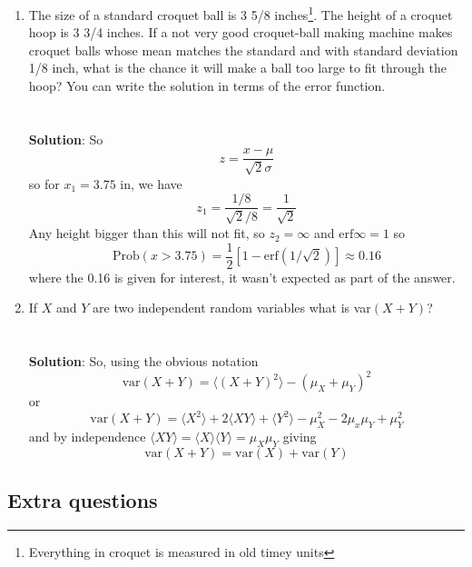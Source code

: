 \documentclass[11pt,a4paper]{scrartcl}
\begin{document}
\begin{enumerate}
\item The size of a standard croquet ball is 3 5/8
  inches\footnote{Everything in croquet is measured in old timey
    units}. The height of a croquet hoop is 3 3/4 inches. If a not
  very good croquet-ball making machine makes croquet balls whose mean
  matches the standard and with standard deviation 1/8 inch, what is
  the chance it will make a ball too large to fit through the hoop?
  You can write the solution in terms of the error function.
  \\ \\ \\ \textbf{Solution}: So
\begin{equation}
z=\frac{x-\mu}{\sqrt{2}\sigma}
\end{equation}
so for $x_1=3.75$ in, we have
\begin{equation}
z_1=\frac{1/8}{\sqrt{2}/8}=\frac{1}{\sqrt{2}}
\end{equation}
Any height bigger than this will not fit, so $z_2=\infty$ and $\mbox{erf}{\infty}=1$ so
\begin{equation}
\mbox{Prob}(x>3.75)=\frac{1}{2}[1-\mbox{erf}(1/\sqrt{2})]\approx 0.16
\end{equation}
where the 0.16 is given for interest, it wasn't expected as part of the answer.

  

\item If $X$ and $Y$ are two independent random variables what is var$(X+Y)$?
 \\ \\ \\
\textbf{Solution}: So, using the obvious notation 
\begin{equation}
  \mbox{var}(X+Y)=\langle (X+Y)^2\rangle -(\mu_X+\mu_Y)^2
\end{equation}
or
\begin{equation}
  \mbox{var}(X+Y)=\langle X^2\rangle +2\langle XY\rangle +\langle Y^2\rangle -\mu_X^2-2\mu_x\mu_Y+\mu_Y^2
\end{equation}
and by independence $\langle XY\rangle=\langle X\rangle\langle Y\rangle=\mu_X\mu_Y$ giving
\begin{equation}
  \mbox{var}(X+Y)=\mbox{var}(X)+\mbox{var}(Y)
\end{equation}



\end{enumerate}

\subsection*{Extra questions}
\end{document}
